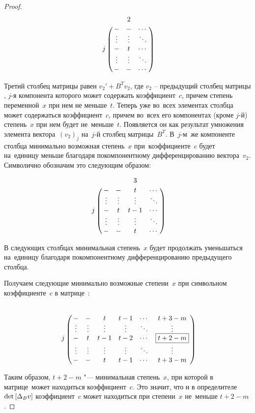 \begin{proof}
\begin{equation*}
    \bordermatrix{
		&           & 2       &        \cr
		&   -       & -       & \cdots \cr
		&   \vdots  & \vdots  & \ddots \cr
		j & -       & t       & \cdots \cr
		&   \vdots  & \vdots  & \ddots \cr
		&   -       & -       & \cdots \cr
	}
\end{equation*}

Третий столбец матрицы равен $v_2' + {B}^Tv_2$, где $v_2$ -- предыдущий столбец матрицы \diffMatrix[B], $j$-я компонента которого может содержать коэффициент~$c$,
причем степень переменной~$x$ при нем не меньше~$t$.
Теперь уже во~всех элементах столбца может содержаться коэффициент~$c$, причем во~всех его компонентах (кроме $j$-й) степень~$x$ при нем будет не~меньше~$t$.
Появляется он как результат умножения элемента вектора~$(v_2)_j$ на~$j$-й столбец матрицы~$B^T$.
В~$j$-м~же компоненте столбца минимально возможная степень~$x$ при~коэффициенте~$c$ будет на~единицу меньше благодаря покомпонентному дифференцированию вектора~$v_2$.
Символично обозначим это следующим образом:

\begin{equation*}
    \bordermatrix{
		&           &         & 3      &        \cr
		&   -       & -       & t      & \cdots \cr
		&   \vdots  & \vdots  & \vdots & \ddots \cr
		j & -       & t       & t - 1  & \cdots \cr
		&   \vdots  & \vdots  & \vdots & \ddots \cr
		&   -       & -       & t      & \cdots \cr
	}
\end{equation*}

В следующих столбцах минимальная степень~$x$ будет продолжать уменьшаться на~единицу благодаря покомпонентному дифференцированию предыдущего столбца.

Получаем следующие минимально возможные степени~$x$ при символьном коэффициенте~$c$ в матрице~\diffMatrix[B]:

\begin{equation*}
    \bordermatrix{
		&           &         &        &        &        &           \cr
		&   -       & -       & t      & t - 1  & \cdots & t + 3 - m \cr
		&   \vdots  & \vdots  & \vdots & \vdots & \ddots & \vdots    \cr
		j & -       & t       & t - 1  & t - 2  & \cdots & \fbox{$t + 2 - m$} \cr
		&   \vdots  & \vdots  & \vdots & \vdots & \ddots & \vdots    \cr
		&   -       & -       & t      & t - 1  & \cdots & t + 3 - m \cr
	}
\end{equation*}

Таким образом, $t + 2 - m$ "--- минимальная степень~$x$, при которой в матрице~\diffMatrix[B] может находиться коэффициент~$c$.
Это значит, что и в определителе $\mathop{\rm det} \text{$ [\Delta_B v] $}$ коэффициент~$c$ может находиться при степени~$x$ не~меньше $t + 2 - m$.


\end{proof}
